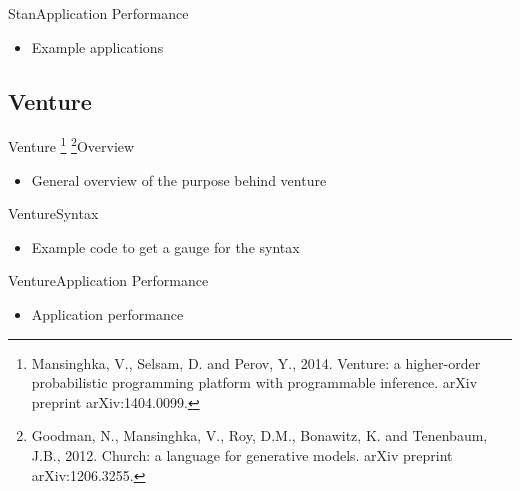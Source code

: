 \documentclass[AERbeamer%
              ,optEnglish%
              ,optBiber%
              ,optBibstyleAlphabetic%
              ,optBeamerClassicFormat%
              ]{AERlatex}%
\begin{document}
\begin{frame}[c]{Stan}{Application Performance}
    \centering
    \begin{itemize}
        \item Example applications
    \end{itemize}
\end{frame}


\subsection{Venture}
\begin{frame}[c]{Venture \footnote{Mansinghka, V., Selsam, D. and Perov, Y., 2014.
                                   Venture: a higher-order probabilistic programming platform
                                   with programmable inference. arXiv preprint arXiv:1404.0099.}
                         \footnote{Goodman, N., Mansinghka, V., Roy, D.M., Bonawitz, K. and Tenenbaum, J.B., 2012.
                                   Church: a language for generative models. arXiv preprint arXiv:1206.3255.}}{Overview}
    \centering
    \begin{itemize}
        \item General overview of the purpose behind venture
    \end{itemize}
\end{frame}


\begin{frame}[c]{Venture}{Syntax}
    \centering
    \begin{itemize}
        \item Example code to get a gauge for the syntax
    \end{itemize}
\end{frame}


\begin{frame}[c]{Venture}{Application Performance}
    \centering
    \begin{itemize}
        \item Application performance
    \end{itemize}
\end{frame}
\end{document}
